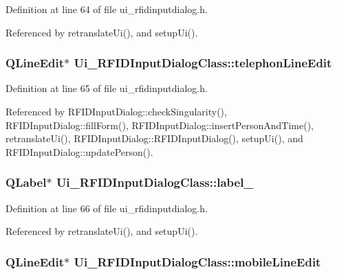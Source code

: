 Definition at line 64 of file ui\_\-rfidinputdialog.h.

Referenced by retranslateUi(), and setupUi().\hypertarget{class_ui___r_f_i_d_input_dialog_class_db31c8901b94fac9a408a313e419c47e}{
\subsubsection[telephonLineEdit]{\setlength{\rightskip}{0pt plus 5cm}QLineEdit$\ast$ {\bf Ui\_\-RFIDInputDialogClass::telephonLineEdit}}}
\label{class_ui___r_f_i_d_input_dialog_class_db31c8901b94fac9a408a313e419c47e}




Definition at line 65 of file ui\_\-rfidinputdialog.h.

Referenced by RFIDInputDialog::checkSingularity(), RFIDInputDialog::fillForm(), RFIDInputDialog::insertPersonAndTime(), retranslateUi(), RFIDInputDialog::RFIDInputDialog(), setupUi(), and RFIDInputDialog::updatePerson().\hypertarget{class_ui___r_f_i_d_input_dialog_class_448c79e3b01ebc022e26df42c0720235}{
\subsubsection[label\_\-9]{\setlength{\rightskip}{0pt plus 5cm}QLabel$\ast$ {\bf Ui\_\-RFIDInputDialogClass::label\_}}}
\label{class_ui___r_f_i_d_input_dialog_class_448c79e3b01ebc022e26df42c0720235}




Definition at line 66 of file ui\_\-rfidinputdialog.h.

Referenced by retranslateUi(), and setupUi().\hypertarget{class_ui___r_f_i_d_input_dialog_class_84a036036ae9f5a4c1814515bfdc1df8}{
\subsubsection[mobileLineEdit]{\setlength{\rightskip}{0pt plus 5cm}QLineEdit$\ast$ {\bf Ui\_\-RFIDInputDialogClass::mobileLineEdit}}}
\label{class_ui___r_f_i_d_input_dialog_class_84a036036ae9f5a4c1814515bfdc1df8}




